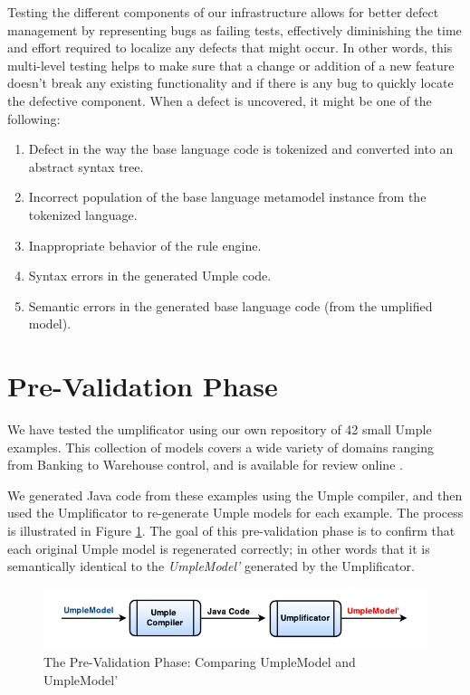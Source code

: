 Testing the different components of our infrastructure allows for better defect management by representing bugs as failing tests, effectively diminishing the time and effort required to localize any defects that might occur. In other words, this multi-level testing helps to make sure that a change or addition of a new feature doesn't break any existing functionality and if there is any bug to quickly locate the defective component. When a defect is uncovered, it might be one of the following:

\begin{enumerate}
\item Defect in the way the base language code is tokenized and converted into an abstract syntax tree.

\item Incorrect population of the base language metamodel instance from the tokenized language.

\item Inappropriate behavior of the rule engine.

\item Syntax errors in the generated Umple code.

\item Semantic errors in the generated base language code (from the umplified model).
\end{enumerate}

\section{Pre-Validation Phase}

We have tested the umplificator using our own repository of 42 small Umple examples. This collection of models covers a wide variety of domains ranging from Banking to Warehouse control, and is available for review online \cite{umpleexamples}.

We generated Java code from these examples using the Umple compiler, and then used the Umplificator to re-generate Umple models for each example. The process is illustrated in Figure \ref{fig:preValidation}. The goal of this pre-validation phase is to confirm that each original Umple model is regenerated correctly; in other words that it is semantically identical to the \textit{UmpleModel'}  generated by the Umplificator.
 
\begin{figure}[h]
\centering
\includegraphics{Figures/preValidation.pdf} 
\caption{The Pre-Validation Phase: Comparing UmpleModel and UmpleModel'}
\label{fig:preValidation}
\end{figure}

